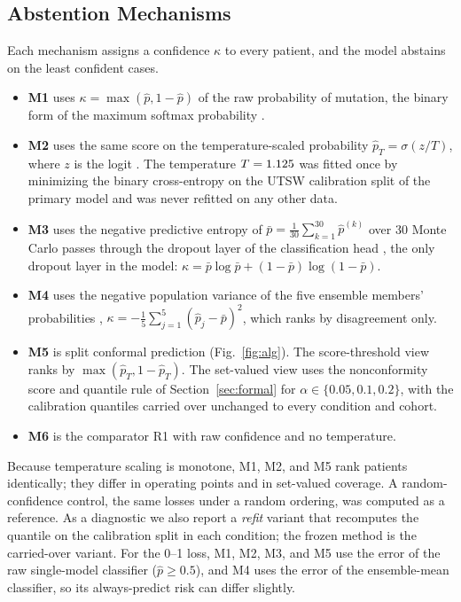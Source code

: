 \documentclass[journal]{IEEEtran}
\begin{document}
\subsection{Abstention Mechanisms}
Each mechanism assigns a confidence $\kappa$ to every patient, and the model abstains on the least confident cases.
\begin{itemize}[leftmargin=1.2em]
\item \textbf{M1} uses $\kappa=\max(\hat p,1-\hat p)$ of the raw probability of mutation, the binary form of the maximum softmax probability \cite{hendrycks2017}.
\item \textbf{M2} uses the same score on the temperature-scaled probability $\hat p_T=\sigma(z/T)$, where $z$ is the logit \cite{guo2017}. The temperature $T=1.125$ was fitted once by minimizing the binary cross-entropy on the UTSW calibration split of the primary model and was never refitted on any other data.
\item \textbf{M3} uses the negative predictive entropy of $\bar p=\frac{1}{30}\sum_{k=1}^{30}\hat p^{(k)}$ over 30 Monte Carlo passes through the dropout layer of the classification head \cite{gal2016}, the only dropout layer in the model: $\kappa=\bar p\log\bar p+(1-\bar p)\log(1-\bar p)$.
\item \textbf{M4} uses the negative population variance of the five ensemble members' probabilities \cite{lakshminarayanan2017}, $\kappa=-\frac15\sum_{j=1}^{5}(\hat p_j-\bar p)^2$, which ranks by disagreement only.
\item \textbf{M5} is split conformal prediction (Fig.~\ref{fig:alg}). The score-threshold view ranks by $\max(\hat p_T,1-\hat p_T)$. The set-valued view uses the nonconformity score and quantile rule of Section~\ref{sec:formal} for $\alpha\in\{0.05,0.1,0.2\}$, with the calibration quantiles carried over unchanged to every condition and cohort.
\item \textbf{M6} is the comparator R1 with raw confidence and no temperature.
\end{itemize}
Because temperature scaling is monotone, M1, M2, and M5 rank patients identically; they differ in operating points and in set-valued coverage. A random-confidence control, the same losses under a random ordering, was computed as a reference. As a diagnostic we also report a \emph{refit} variant that recomputes the quantile on the calibration split in each condition; the frozen method is the carried-over variant. For the 0--1 loss, M1, M2, M3, and M5 use the error of the raw single-model classifier ($\hat p\ge0.5$), and M4 uses the error of the ensemble-mean classifier, so its always-predict risk can differ slightly.
\end{document}
